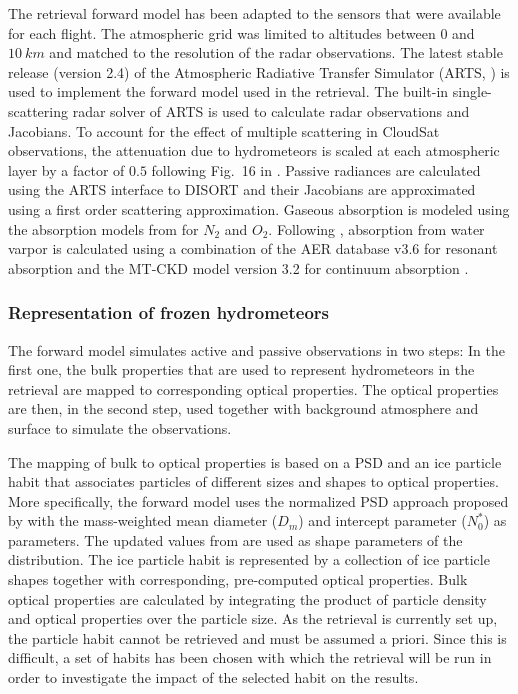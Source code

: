 \documentclass[journal abbreviation, manuscript]{copernicus}
\begin{document}
The retrieval forward model has been adapted to the sensors that were available
for each flight. The atmospheric grid was limited to altitudes between $0$ and
$10\ \unit{km}$ and matched to the resolution of the radar observations. The
latest stable release (version 2.4) of the Atmospheric Radiative Transfer
Simulator (ARTS, \citet{arts18}) is used to implement the forward model used in
the retrieval. The built-in single-scattering radar solver of ARTS is used to
calculate radar observations and Jacobians. To account for the effect of
multiple scattering in CloudSat observations, the attenuation due to
hydrometeors is scaled at each atmospheric layer by a factor of $0.5$ following
Fig.~16 in \citet{battaglia10}. Passive radiances are calculated using the ARTS
interface to DISORT \citep{disort00} and their Jacobians are approximated using
a first order scattering approximation. Gaseous absorption is modeled using the
absorption models from \cite{rosenkranz93} for $N_2$ and $O_2$. Following
\citet{fox20}, absorption from water varpor is calculated using a combination of
the AER database v3.6 \citep{aer36} for resonant absorption and the MT-CKD model
version 3.2 for continuum absorption \citep{mlawer12}.

\subsubsection{Representation of frozen hydrometeors}

The forward model simulates active and passive observations in two steps: In the
first one, the bulk properties that are used to represent hydrometeors in the
retrieval are mapped to corresponding optical properties. The optical properties
are then, in the second step, used together with background atmosphere and
surface to simulate the observations.

The mapping of bulk to optical properties is based on a PSD and an ice particle
habit that associates particles of different sizes and shapes to optical
properties. More specifically, the forward model uses the normalized PSD
approach proposed by \citet{delanoe05} with the mass-weighted mean diameter
($D_m$) and intercept parameter ($N_0^*$) as parameters. The updated values from
\citet{cazenave19} are used as shape parameters of the distribution. The ice
particle habit is represented by a collection of ice particle shapes together
with corresponding, pre-computed optical properties. Bulk optical properties are
calculated by integrating the product of particle density and optical properties
over the particle size. As the retrieval is currently set up, the particle habit
cannot be retrieved and must be assumed a priori. Since this is difficult, a set
of habits has been chosen with which the retrieval will be run in order to
investigate the impact of the selected habit on the results.
\end{document}

